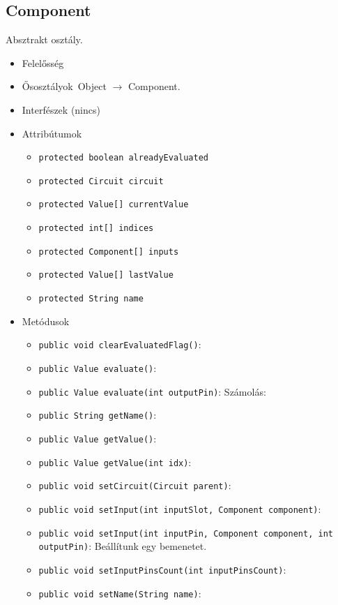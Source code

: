 \subsection{Component}
Absztrakt osztály.
\begin{itemize}
\item Felelősség\\

\item Ősosztályok\ Object $\rightarrow{}$ Component.
\item Interfészek (nincs)
\item Attribútumok $\ $
\begin{itemize}
	\item \texttt{protected boolean alreadyEvaluated} 
	\item \texttt{protected Circuit circuit} 
	\item \texttt{protected Value[] currentValue} 
	\item \texttt{protected int[] indices} 
	\item \texttt{protected Component[] inputs} 
	\item \texttt{protected Value[] lastValue} 
	\item \texttt{protected String name} 
\end{itemize}
\item Metódusok$\ $
\begin{itemize}
	\item \texttt{public void clearEvaluatedFlag()}: 
	\item \texttt{public Value evaluate()}: 
	\item \texttt{public Value evaluate(int outputPin)}: Számolás:
	\item \texttt{public String getName()}: 
	\item \texttt{public Value getValue()}: 
	\item \texttt{public Value getValue(int idx)}: 
	\item \texttt{public void setCircuit(Circuit parent)}: 
	\item \texttt{public void setInput(int inputSlot, Component component)}: 
	\item \texttt{public void setInput(int inputPin, Component component, int outputPin)}: Beállítunk egy bemenetet.
	\item \texttt{public void setInputPinsCount(int inputPinsCount)}: 
	\item \texttt{public void setName(String name)}: 
\end{itemize}
\end{itemize}

